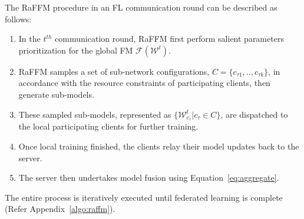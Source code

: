 The RaFFM procedure in an FL communication round can be described as follows:
\begin{enumerate}
    \item In the $t^{th}$ communication round, RaFFM first perform salient parameters prioritization for the global FM $ \mathcal{F}(\mathcal{W}^{t}) $.
    \item RaFFM samples a set of sub-network configurations, $C=\{c_{\tau1},..,c_{\tau k}\}$, in accordance with the resource constraints of participating clients, then generate sub-models.
    \item These sampled sub-models, represented as $\{\mathcal{W}^{t}_{c_\tau} |{c_\tau} \in C\}$, are dispatched to the local participating clients for further training.
    \item Once local training finished, the clients relay their model updates back to the server.
    \item The server then undertakes model fusion using Equation~\ref{eq:aggregate}.
\end{enumerate}
The entire process is iteratively executed until federated learning is complete (Refer Appendix~\ref{algo:raffm}).


